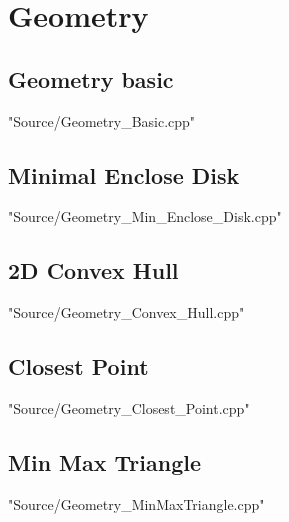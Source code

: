 \documentclass [10pt,twocolumn,oneside]{article}
\begin{document}
\newpage
\section{Geometry}
\subsection{Geometry basic}
 {"Source/Geometry_Basic.cpp"}

\subsection{Minimal Enclose Disk}
 {"Source/Geometry_Min_Enclose_Disk.cpp"}

\subsection{2D Convex Hull}
 {"Source/Geometry_Convex_Hull.cpp"}

\subsection{Closest Point}
 {"Source/Geometry_Closest_Point.cpp"}

\subsection{Min Max Triangle}
 {"Source/Geometry_MinMaxTriangle.cpp"}
\end{document}

